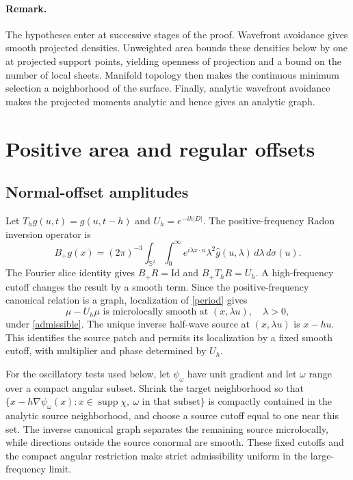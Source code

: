 \documentclass[11pt]{article}
\newcommand{\Sph}{\mathbb S}
\newcommand{\supp}{\operatorname{supp}}
\begin{document}
\paragraph{Remark.}
The hypotheses enter at successive stages of the proof. Wavefront avoidance gives smooth projected densities. Unweighted area bounds these densities below by one at projected support points, yielding openness of projection and a bound on the number of local sheets. Manifold topology then makes the continuous minimum selection a neighborhood of the surface. Finally, analytic wavefront avoidance makes the projected moments analytic and hence gives an analytic graph.

\section{Positive area and regular offsets}\label{app:focal}\label{sec:focal}
\subsection{Normal-offset amplitudes}
Let $T_hg(u,t)=g(u,t-h)$ and $U_h=e^{-ih|D|}$. The positive-frequency Radon inversion operator is
\[
 B_+g(x)=(2\pi)^{-3}\int_{\Sph^2}\int_0^\infty
 e^{i\lambda x\cdot u}\lambda^2\widehat g(u,\lambda)
 \,d\lambda\,d\sigma(u).
\]
The Fourier slice identity gives $B_+R=\mathrm{Id}$ and $B_+T_hR=U_h$. A high-frequency cutoff changes the result by a smooth term. Since the positive-frequency canonical relation is a graph, localization of \eqref{period} gives
\begin{equation}\label{exceptionhalf}
 \mu-U_h\mu\text{ is microlocally smooth at }(x,\lambda u),\quad\lambda>0,
\end{equation}
under \eqref{admissible}. The unique inverse half-wave source at $(x,\lambda u)$ is $x-hu$. This identifies the source patch and permits its localization by a fixed smooth cutoff, with multiplier and phase determined by $U_h$.

For the oscillatory tests used below, let $\psi_\omega$ have unit gradient and let $\omega$ range over a compact angular subset. Shrink the target neighborhood so that
$\{x-h\nabla\psi_\omega(x):x\in\supp\chi,\ \omega\text{ in that subset}\}$
is compactly contained in the analytic source neighborhood, and choose a source cutoff equal to one near this set. The inverse canonical graph separates the remaining source microlocally, while directions outside the source conormal are smooth. These fixed cutoffs and the compact angular restriction make strict admissibility uniform in the large-frequency limit.
\end{document}
